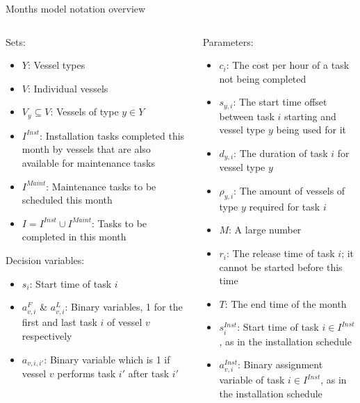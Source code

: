 \documentclass{beamer}
\newcommand{\smallc}{\scriptsize}
\begin{document}
\begin{frame}{Months model notation overview}
\smallc
\begin{columns}
\begin{column}{.48\textwidth}
Sets:
\begin{itemize}
\item $Y$: Vessel types
\item $V$: Individual vessels
\item $V_y \subseteq V$: Vessels of type $y \in Y$ 
\item $I^{Inst}$:  Installation tasks completed this month by vessels that are also available for maintenance tasks
\item $I^{Maint}$: Maintenance tasks to be scheduled this month
\item $I = I^{Inst} \cup I^{Maint}$:  Tasks to be completed in this month
\end{itemize}

Decision variables:
\begin{itemize}
\item $s_i$: Start time of task $i$
\item $a^F_{v,i}$ \& $a^L_{v,i}$: Binary variables, 1 for the first and last task $i$ of vessel $v$ respectively
\item $a_{v,i,i'}$: Binary variable which is 1 if vessel $v$ performs task $i'$ after task $i'$
\end{itemize}
\end{column}

\hfill

\begin{column}{.48\textwidth}
Parameters:
\begin{itemize}
\item $c_i$: The cost per hour of a task not being completed
\item $s_{y,i}$: The start time offset between task $i$ starting and vessel type $y$ being used for it
\item $d_{y,i}$: The duration of task $i$ for vessel type $y$
\item $\rho_{y,i}$: The amount of vessels of type $y$ required for task $i$
\item $M$: A large number
\item $r_i$: The release time of task $i$; it cannot be started before this time
\item $T$: The end time of the month
\item $s^{Inst}_i$: Start time of task $i \in I^{Inst}$, as in the installation schedule
\item $a^{Inst}_{v,i}$: Binary assignment variable of task $i \in I^{Inst}$, as in the installation schedule
\end{itemize}
\end{column}
\end{columns}
\end{frame}
\end{document}
